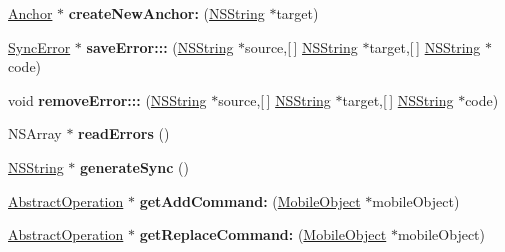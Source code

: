 \begin{DoxyCompactItemize}
\item 
\hypertarget{interface_sync_engine_a011e288426526cef8ddcefc18759065b}{
\hyperlink{interface_anchor}{\-Anchor} $\ast$ {\bfseries create\-New\-Anchor\-:} (\hyperlink{class_n_s_string}{\-N\-S\-String} $\ast$target)}
\label{interface_sync_engine_a011e288426526cef8ddcefc18759065b}

\item 
\hypertarget{interface_sync_engine_a01993c323f1ecb36e42243ac66452110}{
\hyperlink{interface_sync_error}{\-Sync\-Error} $\ast$ {\bfseries save\-Error\-:::} (\hyperlink{class_n_s_string}{\-N\-S\-String} $\ast$source,\mbox{[}$\,$\mbox{]} \hyperlink{class_n_s_string}{\-N\-S\-String} $\ast$target,\mbox{[}$\,$\mbox{]} \hyperlink{class_n_s_string}{\-N\-S\-String} $\ast$code)}
\label{interface_sync_engine_a01993c323f1ecb36e42243ac66452110}

\item 
\hypertarget{interface_sync_engine_a40449d9ce7ba8e48724cb7afc79bb174}{
void {\bfseries remove\-Error\-:::} (\hyperlink{class_n_s_string}{\-N\-S\-String} $\ast$source,\mbox{[}$\,$\mbox{]} \hyperlink{class_n_s_string}{\-N\-S\-String} $\ast$target,\mbox{[}$\,$\mbox{]} \hyperlink{class_n_s_string}{\-N\-S\-String} $\ast$code)}
\label{interface_sync_engine_a40449d9ce7ba8e48724cb7afc79bb174}

\item 
\hypertarget{interface_sync_engine_a4e75e7f900781c5c90a5f67363eca491}{
\-N\-S\-Array $\ast$ {\bfseries read\-Errors} ()}
\label{interface_sync_engine_a4e75e7f900781c5c90a5f67363eca491}

\item 
\hypertarget{interface_sync_engine_a8a1caa5be1ad1c062fee5b72808381c8}{
\hyperlink{class_n_s_string}{\-N\-S\-String} $\ast$ {\bfseries generate\-Sync} ()}
\label{interface_sync_engine_a8a1caa5be1ad1c062fee5b72808381c8}

\item 
\hypertarget{interface_sync_engine_a2303b3b9b8aab7e98a20fd328f11eadb}{
\hyperlink{interface_abstract_operation}{\-Abstract\-Operation} $\ast$ {\bfseries get\-Add\-Command\-:} (\hyperlink{interface_mobile_object}{\-Mobile\-Object} $\ast$mobile\-Object)}
\label{interface_sync_engine_a2303b3b9b8aab7e98a20fd328f11eadb}

\item 
\hypertarget{interface_sync_engine_aa245f581bbf066c71b1e50f66452ffd3}{
\hyperlink{interface_abstract_operation}{\-Abstract\-Operation} $\ast$ {\bfseries get\-Replace\-Command\-:} (\hyperlink{interface_mobile_object}{\-Mobile\-Object} $\ast$mobile\-Object)}
\label{interface_sync_engine_aa245f581bbf066c71b1e50f66452ffd3}


\end{DoxyCompactItemize}
